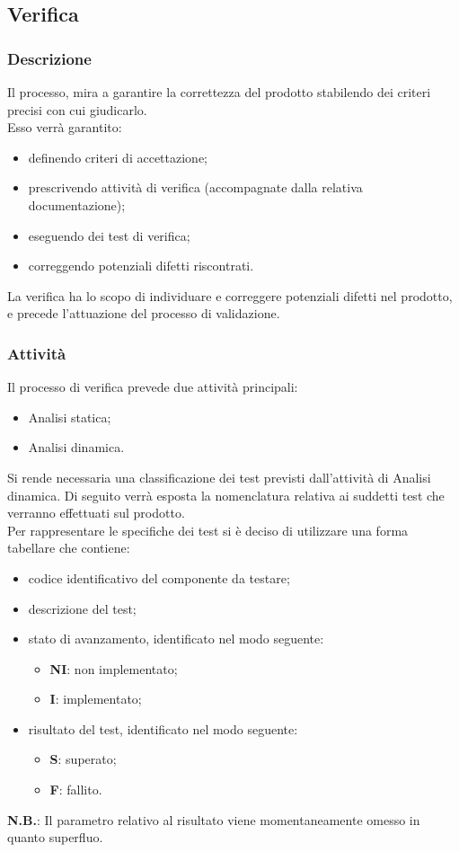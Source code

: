 \subsection{Verifica}
		\subsubsection{Descrizione}
		Il processo, mira a garantire la correttezza del prodotto stabilendo dei criteri precisi con cui giudicarlo. \\ Esso verrà garantito:
		\begin{itemize}
			\item definendo criteri di accettazione;
			\item prescrivendo attività di verifica (accompagnate dalla relativa documentazione);
			\item eseguendo dei test di verifica;
			\item correggendo potenziali difetti riscontrati.
		\end{itemize}
		La verifica ha lo scopo di individuare e correggere potenziali difetti nel prodotto, e precede l'attuazione del processo di validazione.
		
		\subsubsection{Attività}
		Il processo di verifica prevede due attività principali:
		\begin{itemize}
			\item Analisi statica;
			\item Analisi dinamica.
		\end{itemize}
		
		\noindent Si rende necessaria una classificazione dei test previsti dall'attività di Analisi dinamica. Di seguito verrà esposta la nomenclatura relativa ai suddetti test che verranno effettuati sul prodotto. \\
		Per rappresentare le specifiche dei test si è deciso di utilizzare una forma tabellare che contiene:
		\begin{itemize}
			\item codice identificativo del componente da testare;
			\item descrizione del test;
			\item stato di avanzamento, identificato nel modo seguente:
				\begin{itemize}
					\item \textbf{NI}: non implementato;
					\item \textbf{I}: implementato;						
				\end{itemize}		
			\item risultato del test, identificato nel modo seguente:
				\begin{itemize}
					\item \textbf{S}: superato;
					\item \textbf{F}: fallito.
				\end{itemize}
		\end{itemize}	
		\textbf{N.B.}: Il parametro relativo al risultato viene momentaneamente omesso in quanto superfluo.						 
					
